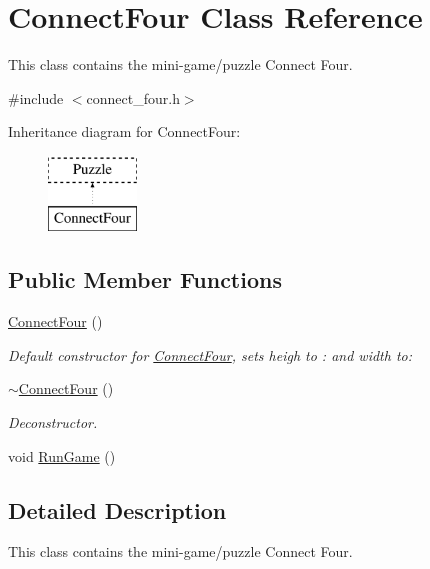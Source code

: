 \hypertarget{classConnectFour}{\section{Connect\-Four Class Reference}
\label{classConnectFour}
}


This class contains the mini-\/game/puzzle Connect Four.  




{\ttfamily \#include $<$connect\-\_\-four.\-h$>$}

Inheritance diagram for Connect\-Four\-:\begin{figure}[H]
\begin{center}
\leavevmode
\includegraphics[height=2.000000cm]{classConnectFour}
\end{center}
\end{figure}
\subsection*{Public Member Functions}
\begin{DoxyCompactItemize}
\item 
\hyperlink{classConnectFour_a9d7a0db424f22513386fa60ed2d5b575}{Connect\-Four} ()
\begin{DoxyCompactList}\small\item\em Default constructor for \hyperlink{classConnectFour}{Connect\-Four}, sets heigh to \-: and width to\-: \end{DoxyCompactList}\item 
\hypertarget{classConnectFour_ae7d414d7f7f694fd427bfeaef80bd1f9}{\hyperlink{classConnectFour_ae7d414d7f7f694fd427bfeaef80bd1f9}{$\sim$\-Connect\-Four} ()}\label{classConnectFour_ae7d414d7f7f694fd427bfeaef80bd1f9}

\begin{DoxyCompactList}\small\item\em Deconstructor. \end{DoxyCompactList}\item 
void \hyperlink{classConnectFour_a1e58549ad7980f6a1311c92f5e67e62c}{Run\-Game} ()
\end{DoxyCompactItemize}


\subsection{Detailed Description}
This class contains the mini-\/game/puzzle Connect Four. 

